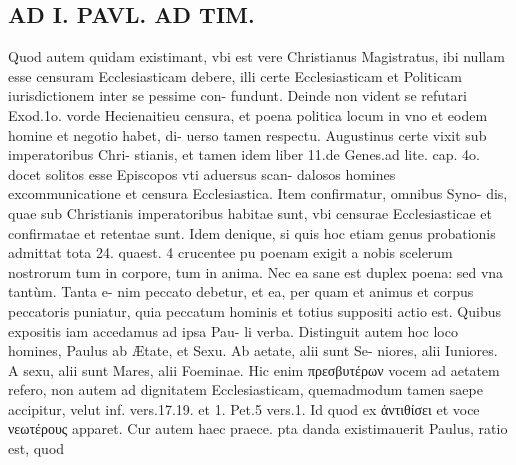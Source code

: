 \documentclass{article}
\begin{document}
\begin{pages}
\section*{AD I. PAVL. AD TIM. }
\marginpar{[ p.248 ]}\pstart Quod autem quidam existimant, vbi est vere Christianus Magistratus, ibi nullam esse censuram Ecclesiasticam debere, illi certe Ecclesiasticam et Politicam iurisdictionem inter se pessime con- fundunt. Deinde non vident se refutari Exod.1o. vorde Hecienaitieu censura, et poena politica locum in vno et eodem homine et negotio habet, di- uerso tamen respectu.  \pend\pstart Augustinus certe vixit sub imperatoribus Chri- stianis, et tamen idem liber 11.de Genes.ad lite. cap. 4o. docet solitos esse Episcopos vti aduersus scan- dalosos homines excommunicatione et censura Ecclesiastica. Item confirmatur, omnibus Syno- dis, quae sub Christianis imperatoribus habitae sunt, vbi censurae Ecclesiasticae et confirmatae et retentae sunt. Idem denique, si quis hoc etiam genus probationis admittat tota 24. quaest. 4 crucentee pu poenam exigit a nobis scelerum nostrorum tum in corpore, tum in anima. Nec ea sane est duplex poena: sed vna tantùm. Tanta e- nim peccato debetur, et ea, per quam et animus et corpus peccatoris puniatur, quia peccatum hominis et totius suppositi actio est.  \pend\pstart Quibus expositis iam accedamus ad ipsa Pau- li verba. Distinguit autem hoc loco homines, Paulus ab Ætate, et Sexu. Ab aetate, alii sunt Se- niores, alii Iuniores. A sexu, alii sunt Mares, alii Foeminae. Hic enim πρεσβυτέρων vocem ad aetatem refero, non autem ad dignitatem Ecclesiasticam, quemadmodum tamen saepe accipitur, velut inf. vers.17.19. et 1. Pet.5 vers.1. Id quod ex ἀντιθίσει et voce νεωτέρους apparet. Cur autem haec praece. pta danda existimauerit Paulus, ratio est, quod  \pend

\end{pages}
\end{document}
